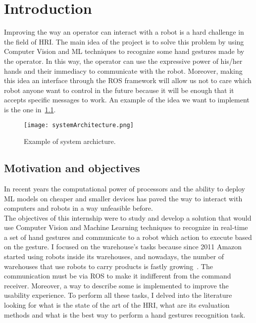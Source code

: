 \documentclass[../thesis.tex]{subfiles}
\begin{document}
\chapter{Introduction}\label{cap:introduction}
Improving the way an operator can interact with a robot is a hard challenge in the field of \acrfull{HRI}. The main idea of the project is to solve this problem by using Computer Vision and \acrfull{ML} techniques to recognize some hand gestures made by the operator. In this way, the operator can use the expressive power of his/her hands and their immediacy to communicate with the robot. Moreover, making this idea an interface through the \acrfull{ROS} framework will allow us not to care which robot anyone want to control in the future because it will be enough that it accepts specific messages to work. An example of the idea we want to implement is the one in~\ref{fig:systemArchitecture}.

\begin{figure}[H]
  \centering
  \texttt{[image: systemArchitecture.png]}
  \caption{Example of system archicture.}
  \label{fig:systemArchitecture}
\end{figure}

\section{Motivation and objectives}\label{s:motivation-and-objectives}
In recent years the computational power of processors and the ability to deploy \acrshort{ML} models on cheaper and smaller devices has paved the way to interact with computers and robots in a way unfeasible before.\\
The objectives of this internship were to study and develop a solution that would use Computer Vision and Machine Learning techniques to recognize in real-time a set of hand gestures and communicate to a robot which action to execute based on the gesture. I focused on the warehouse's tasks because since 2011 Amazon started using robots inside its warehouses, and nowadays, the number of warehouses that use robots to carry products is fastly growing~\cite{paper:bogue2016}. The communication must be via \acrshort{ROS} to make it indifferent from the command receiver. Moreover, a way to describe some  is implemented to improve the usability experience. To perform all these tasks, I delved into the literature looking for what is the state of the art of the \acrshort{HRI}, what are its evaluation methods and what is the best way to perform a hand gestures recognition task.
\end{document}
